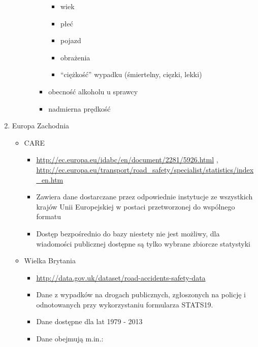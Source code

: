 \begin{enumerate}
\begin{itemize}
\begin{itemize}
\begin{itemize}
        \begin{itemize}
        \itemsep1pt\parskip0pt
        \item
          wiek\\
        \item
          płeć\\
        \item
          pojazd\\
        \item
          obrażenia\\
        \item
          ``ciężkość'' wypadku (śmiertelny, cięzki, lekki)\\
        \end{itemize}
      \item
        obecność alkoholu u sprawcy\\
      \item
        nadmierna prędkość\\
      \end{itemize}
    \end{itemize}
  \end{itemize}
\item
  Europa Zachodnia

  \begin{itemize}
  \item
    CARE

    \begin{itemize}
    \itemsep1pt\parskip0pt
    \item
      \url{http://ec.europa.eu/idabc/en/document/2281/5926.html} ,
      \url{http://ec.europa.eu/transport/road_safety/specialist/statistics/index_en.htm}\\
    \item
      Zawiera dane dostarczane przez odpowiednie instytucje ze
      wszystkich krajów Unii Europejskiej w postaci przetworzonej do
      wspólnego formatu\\
    \item
      Dostęp bezpośrednio do bazy niestety nie jest możliwy, dla
      wiadomości publicznej dostępne są tylko wybrane zbiorcze
      statystyki\\
    \end{itemize}
  \item
    Wielka Brytania

    \begin{itemize}
    \item
      \url{http://data.gov.uk/dataset/road-accidents-safety-data}\\
    \item
      Dane z wypadków na drogach publicznych, zgłoszonych na policję i
      odnotowanych przy wykorzystaniu formularza STATS19.\\
    \item
      Dane dostępne dla lat 1979 - 2013\\
    \item
      Dane obejmują m.in.:


\end{itemize}
\end{itemize}
\end{enumerate}
